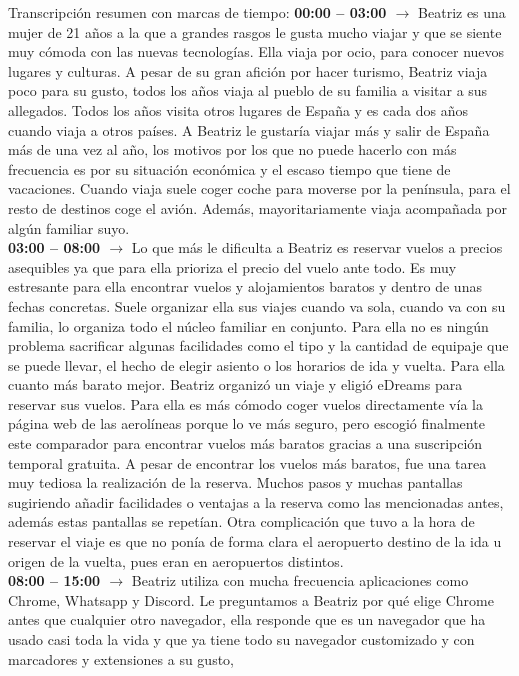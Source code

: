 Transcripción resumen con marcas de tiempo:
\noindent\textbf{00:00 -- 03:00 $\rightarrow$} Beatriz es una mujer de 21 años a la que a grandes rasgos le gusta mucho viajar y que se siente muy cómoda con las nuevas tecnologías.
Ella viaja por ocio, para conocer nuevos lugares y culturas. A pesar de su gran afición por hacer turismo, Beatriz viaja poco para su gusto, todos los años viaja al pueblo de su 
familia a visitar a sus allegados. Todos los años visita otros lugares de España y es cada dos años cuando viaja a otros países. A Beatriz le gustaría viajar más y salir de España
más de una vez al año, los motivos por los que no puede hacerlo con más frecuencia es por su situación económica y el escaso tiempo que tiene de vacaciones. Cuando viaja suele 
coger coche para moverse por la península, para el resto de destinos coge el avión. Además, mayoritariamente viaja acompañada por algún familiar suyo. \\
\textbf{03:00 -- 08:00 $\rightarrow$} Lo que más le dificulta a Beatriz es reservar vuelos a precios asequibles ya que para ella prioriza el precio del vuelo ante todo. Es muy 
estresante para ella encontrar vuelos y alojamientos baratos y dentro de unas fechas concretas. Suele organizar ella sus viajes cuando va sola, cuando va con su familia, lo 
organiza todo el núcleo familiar en conjunto. Para ella no es ningún problema sacrificar algunas facilidades como el  tipo y la cantidad de equipaje que se puede llevar, el 
hecho de elegir asiento o los horarios de ida y vuelta. Para ella cuanto más barato mejor. Beatriz organizó un viaje y eligió eDreams para reservar sus vuelos. Para ella es más
cómodo coger vuelos directamente vía la página web de las aerolíneas porque lo ve más seguro, pero escogió finalmente este comparador para encontrar vuelos más baratos gracias
a una suscripción temporal gratuita. A pesar de encontrar los vuelos más baratos, fue una tarea muy tediosa la realización de la reserva. Muchos pasos y muchas pantallas 
sugiriendo añadir facilidades o ventajas a la reserva como las mencionadas antes, además estas pantallas se repetían. Otra complicación que tuvo a la hora de reservar el viaje 
es que no ponía de forma clara el aeropuerto destino de la ida u origen de la vuelta, pues eran en aeropuertos distintos. \\
\textbf{08:00 -- 15:00 $\rightarrow$} Beatriz utiliza con mucha frecuencia aplicaciones como Chrome, Whatsapp y Discord. Le preguntamos a Beatriz por qué elige Chrome antes que
cualquier otro navegador, ella responde que es un navegador que ha usado casi toda la vida y que ya tiene todo su navegador customizado y con marcadores y extensiones a su gusto, 
